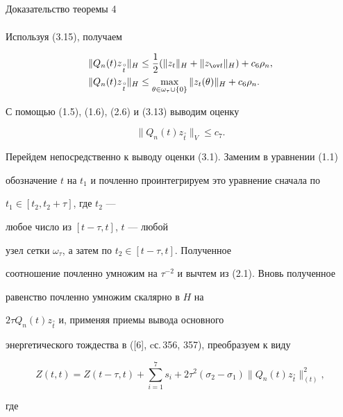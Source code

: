 \begin{pf*}{Доказательство теоремы 4}
\begin{align}
\end{align}


Используя (3.15), получаем


\begin{align}


\|Q_n(t)z_{\overset{\,\circ}{t}}\|_H&\le\frac12


(\|z_t\|_H+\|z_{\ov t}\|_H)+c_6\rho_n,\\


\|Q_n(t)z_{\overset{\,\circ}{t}}\|_H&\le\max\limits_


{\theta\in\omega_{\tau}\cup\{0\}}\|z_t(\theta)\|_H+c_6\rho_n.


\end{align}


С помощью (1.5), (1.6), (2.6) и (3.13) выводим оценку


\begin{equation}


\|Q_n(t)z_{\overset{\,\circ}{t}}\|_V\le c_7.


\end{equation}





Перейдем непосредственно к выводу оценки (3.1). Заменим в уравнении (1.1)


обозначение $t$ на $t_1$ и почленно проинтегрируем это уравнение сначала по


$t_1\in[t_2,t_2+\tau]$, где $t_2$ ---


любое число из $[t-\tau,t]$, $t$ --- любой


узел сетки $\omega_{\tau}$, а затем по $t_2\in[t-\tau,t]$. Полученное


соотношение почленно умножим на $\tau^{-2}$ и вычтем из (2.1). Вновь полученное


равенство почленно умножим скалярно в $H$ на


$2\tau Q_n(t)z_{\overset{\,\circ}{t}}$ и, применяя приемы вывода основного


энергетического тождества в ([6], cс.\,356, 357), преобразуем к виду


\begin{equation}


Z(t,t)=Z(t-\tau,t)+\sum_{i=1}^7s_i+2\tau^2(\sigma_2-\sigma_1)


\|Q_n(t)z_{\overset{\,\circ}{t}}\|_{(t)}^2,


\end{equation}


где



\end{pf*}
